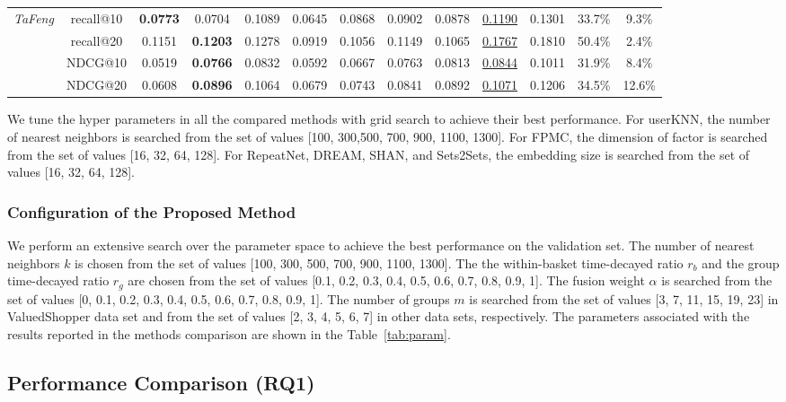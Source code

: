 \documentclass[sigconf]{acmart}
\begin{document}
\begin{table*}[ht]
{\begin{tabular}{lccccccccc|ccc}
\midrule
\multirow{4}{*}{\emph{TaFeng}}&recall@10 &\textbf{0.0773}&0.0704&0.1089&0.0645&0.0868&0.0902&0.0878&\underline{0.1190}&0.1301&33.7\%&9.3\%\\
&recall@20 &0.1151&\textbf{0.1203}&0.1278&0.0919&0.1056&0.1149&0.1065&\underline{0.1767}&0.1810&50.4\%&2.4\%\\
&NDCG@10 &0.0519&\textbf{0.0766}&0.0832&0.0592&0.0667&0.0763&0.0813&\underline{0.0844}&0.1011&31.9\%&8.4\%\\
&NDCG@20  &0.0608&\textbf{0.0896}&0.1064&0.0679&0.0743&0.0841&0.0892&\underline{0.1071}&0.1206&34.5\%&12.6\%\\
\bottomrule
\end{tabular}
}
\label{tab:comp1}
\end{table*}


We tune the hyper parameters in all the compared methods with grid search to achieve their best performance. For userKNN, the number of nearest neighbors is searched from the set of values [100, 300,500, 700, 900, 1100, 1300]. For FPMC, the dimension of factor is searched from the set of values [16, 32, 64, 128]. For RepeatNet, DREAM, SHAN, and Sets2Sets, the  embedding size is searched from the set of values [16, 32, 64, 128]. 





\subsubsection{Configuration of the Proposed  Method}
We  perform an extensive search over the parameter space to achieve the best performance on the validation  set. The number of nearest neighbors $k$ is chosen from the set of values [100, 300, 500, 700, 900, 1100, 1300]. The the within-basket time-decayed ratio  $r_b$ and the group  time-decayed ratio $r_g$ are chosen from the set of values [0.1, 0.2, 0.3, 0.4,  0.5, 0.6, 0.7, 0.8, 0.9, 1].  The fusion weight  $\alpha$ is searched from the set of values [0, 0.1, 0.2, 0.3, 0.4, 0.5, 0.6, 0.7, 0.8, 0.9, 1]. The  number of groups  $m$ is  searched from the set of values [3, 7, 11, 15, 19, 23] in ValuedShopper data set and from the set of values [2, 3, 4, 5, 6, 7] in other data sets,  respectively. The parameters associated with the  results  reported in  the methods  comparison are shown in the Table~\ref{tab:param}.




\subsection{Performance Comparison (RQ1)}
\end{document}
